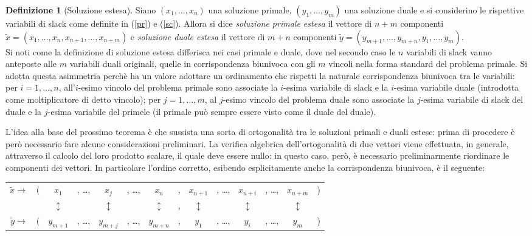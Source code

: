 \documentclass{article}[10pt]
\theoremstyle{theorem}
\theoremstyle{definition}
\newtheorem{definizione}{Definizione}[section]
\theoremstyle{definition}
\theoremstyle{definition}
\begin{document}
	\begin{definizione}[Soluzione estesa]
	  Siano $(x_1,\ldots,x_n)$ una soluzione primale, $(y_1,\ldots,y_m)$ una soluzione duale e si considerino le rispettive variabili di slack come definite in (\ref{pr}) e (\ref{sc}). Allora si dice \emph{soluzione primale estesa} il vettore  di $n+m$ componenti $\tilde{x}=(x_1,\ldots,x_n,x_{n+1},\ldots,x_{n+m})$ e \emph{soluzione duale estesa} il vettore di $m+n$ componenti $\tilde{y}=(y_{m+1},\ldots,y_{m+n},y_1,\ldots,y_m)$.\\
          Si noti come la definizione di soluzione estesa differisca nei casi primale e duale, dove nel secondo caso le $n$ variabili di slack vanno anteposte alle $m$ variabili duali originali, quelle in corrispondenza biunivoca con gli $m$ vincoli nella forma standard del problema primale.
          Si adotta questa asimmetria perch\`e ha un valore adottare un ordinamento che rispetti la naturale corrispondenza biunivoca tra le variabili: per $i=1,\ldots, n$, all'$i$-esimo vincolo del problema primale sono associate la $i$-esima variabile di slack e la $i$-esima variabile duale (introdotta come moltiplicatore di detto vincolo);
          per $j=1,\ldots, m$, al $j$-esimo vincolo del problema duale sono associate la $j$-esima variabile di slack del duale e la $j$-esima variabile del primele (il primale pu\`o sempre essere visto come il duale del duale).
          
	\end{definizione}	
	
	L'idea alla base del prossimo teorema è che sussista una sorta di ortogonalità tra le soluzioni primali e duali estese: prima di procedere è però necessario fare alcune considerazioni preliminari. La verifica algebrica dell'ortogonalità di due vettori viene effettuata, in generale, attraverso il calcolo del loro prodotto scalare, il quale deve essere nullo: in questo caso, però, è necessario preliminarmente riordinare le componenti dei vettori. In particolare l'ordine corretto, esibendo esplicitamente anche la corrispondenza biunivoca, è il seguente:

	\begin{tabular}{rccccccccccccr}
		$\tilde{x} \rightarrow $ & $($ &     $x_1$    &, \ldots , &     $x_j$    &, \ldots , &      $x_n$   & , &   $x_{n+1}$ & , \ldots , &   $x_{n+i}$ & , \ldots , & $x_{n+m}$ & ) \\
		                         &     &$\updownarrow$&           &$\updownarrow$&           &$\updownarrow$& , &$\updownarrow$&           &$\updownarrow$&           &$\updownarrow$&   \\
		$\tilde{y} \rightarrow $ & $($ &   $y_{m+1}$   &, \ldots , &   $y_{m+j}$   &, \ldots , &     $y_{m+n}$ & , &    $y_1$   & , \ldots , &    $y_i$   & , \ldots , &   $y_m$  & )
	\end{tabular}
\end{document}
